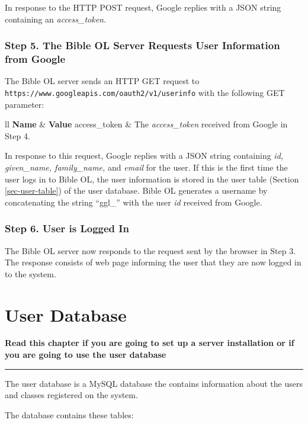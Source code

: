 \documentclass[11pt,oneside,a4paper]{memoir}
\makeatletter
\newcommand{\headii}[2]{\textbf{#1} & \textbf{#2}}
\newenvironment{my-tabu}[2]{%
\begin{center}
\begin{tabu}{@{}#1@{}}
  \toprule
  #2\\\addlinespace[-1mm]
  \midrule
}{%
\addlinespace[-1mm]\bottomrule
\end{tabu}
\end{center}%
}
\makeatother
\begin{document}
In response to the HTTP POST request, Google replies with a JSON string containing an
\emph{access\_token}.


\subsection*{Step 5. The Bible OL Server Requests User Information from Google}

The Bible OL server sends an HTTP GET request to
\texttt{https://www.googleapis.com/oauth2/\allowbreak{}v1/\allowbreak{}userinfo} with the following
GET parameter:

\begin{my-tabu}{ll}{ \headii{Name}{Value} }
access\_token & The \emph{access\_token} received from Google in Step 4.\\
\end{my-tabu}

In response to this request, Google replies with a JSON string containing \emph{id,
  given\_name, family\_name,} and \emph{email} for the user. If this is the first time the user logs
in to Bible OL, the user information is stored in the user table (Section \ref{sec-user-table}) of
the user database. Bible OL generates a username by concatenating the string ``ggl\_'' with the user
\emph{id} received from Google.

\subsection*{Step 6. User is Logged In}

The Bible OL server now responds to the request sent by the browser in Step 3. The response consists
of web page informing the user that they are now logged in to the system.




\chapter{User Database}\label{chap-user-database}

\textbf{Read this chapter if you are going to set up a server installation or if you are going to
  use the user database}
\plainbreak{3}

The user database is a MySQL database the contains information about the users and classes
registered on the system.

The database contains these tables:
\end{document}
